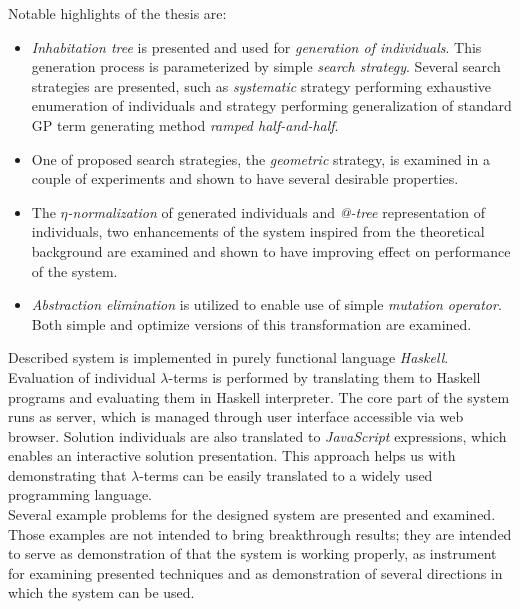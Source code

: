 \documentclass[12pt,a4paper]{report}
\makeatletter
\newcommand{\lterms}{$\lambda$-terms\xspace}
\newcommand{\atTree}{@-tree\xspace}
\makeatother
\begin{document}
Notable highlights of the thesis are: 
\begin{itemize}
 \item \textit{Inhabitation tree} 
   is presented and used for \textit{generation of individuals}.
   This generation process is parameterized by simple 
   \textit{search strategy}. Several search strategies are presented,
   such as \textit{systematic} strategy performing exhaustive enumeration
   of individuals and strategy performing generalization of 
   standard GP term generating method \textit{ramped half-and-half}.  
 \item One of proposed search strategies, the \textit{geometric} strategy, is
   examined in a couple of experiments and shown to have 
   several desirable properties.
 \item The \textit{$\eta$-normalization} of generated individuals
       and \textit{\atTree} representation of individuals, 
       two enhancements of the system inspired from the theoretical
       background are examined and shown to have 
       improving effect on performance of the system.     
 \item \textit{Abstraction elimination} is utilized
   to enable use of simple \textit{mutation operator}.
   Both simple and optimize versions of this transformation are examined.

\end{itemize}

Described system is implemented in purely functional language 
\textit{Haskell}. Evaluation of individual \lterms is 
performed by translating them to
Haskell programs and evaluating them in Haskell interpreter. 
The core part of the system runs as server, which is 
managed through user interface accessible via
web browser. Solution individuals are also translated
to \textit{JavaScript} expressions, which enables  
an interactive solution presentation.
This approach helps us with demonstrating 
that \lterms can be easily translated to a 
widely used programming language.\\

Several example problems for the designed system are presented 
and examined. Those examples are not intended to 
bring breakthrough results; they are intended to 
serve as demonstration of that the system is working properly,
as instrument for examining presented techniques and 
as demonstration of several directions in which the system
can be used.      
\end{document}
